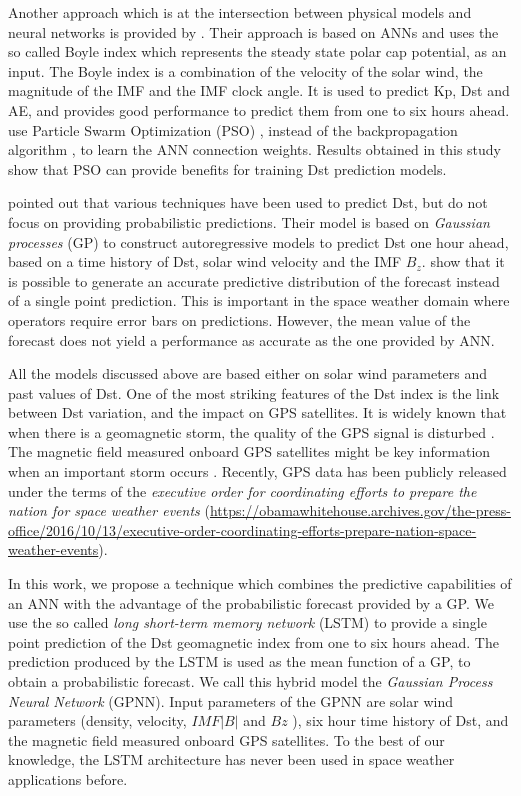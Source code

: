 Another approach which is at the intersection between physical models and neural networks is provided by 
\citet{Bala2012}. Their approach is based on ANNs and uses the so called Boyle index which represents 
the steady state polar cap potential, as an input. The Boyle index is a combination of the velocity of 
the solar wind, the magnitude of the IMF and the IMF clock angle. It is used to predict Kp, Dst and AE, 
and provides good performance to predict them from one to six hours ahead. \citet{Lazzus} use 
Particle Swarm Optimization (PSO) \citep{eberhart1995new}, instead of the backpropagation algorithm 
\citep{rummelhart1986parallel}, to learn the ANN connection weights. Results obtained in this study show 
that PSO can provide benefits for training Dst prediction models.

\citet{ChandorkarDst} pointed out that various techniques have been used to predict Dst, but do not 
focus on providing probabilistic predictions. Their model is based on \emph{Gaussian processes} (GP) to construct 
autoregressive models to predict Dst one hour ahead, based on a time history of Dst, solar wind velocity and 
the IMF $B_z$. \citet{ChandorkarDst} show that it is possible to generate an accurate predictive distribution 
of the forecast instead of a single point prediction. This is important in the space weather domain where 
operators require error bars on predictions. However, the mean value of the forecast does not yield a 
performance as accurate as the one provided by ANN. 

All the models discussed above are based either on solar wind parameters and past values of Dst. One of the most 
striking features of the Dst index is the link between Dst variation, and the impact on GPS satellites. 
It is widely known that when there is a geomagnetic storm, the quality of the GPS signal is disturbed 
\citep{astafyeva2014geomagnetic}. The magnetic field measured onboard GPS satellites might be key information 
when an important storm occurs \citep{morley2017energetic}. Recently, GPS data has been publicly released under 
the terms of the \emph{executive order for coordinating efforts to prepare the nation for space weather events} 
(\url{https://obamawhitehouse.archives.gov/the-press-office/2016/10/13/executive-order-coordinating-efforts-prepare-nation-space-weather-events}). 

In this work, we propose a technique which combines the predictive capabilities of an ANN with the advantage of the 
probabilistic forecast provided by a GP. We use the so called \emph{long short-term memory network} (LSTM) 
\citep{hochreiter1997long} to provide a single point prediction of the Dst geomagnetic index from one to six 
hours ahead. The prediction produced by the LSTM is used as the mean function of a GP, to obtain a 
probabilistic forecast. We call this hybrid model the \emph{Gaussian Process Neural Network} (GPNN). 
Input parameters of the GPNN are solar wind parameters (density, velocity,  
\( IMF  \vert B \vert  \)  and \(  Bz \) ), six hour time history of Dst, and the magnetic field 
measured onboard GPS satellites. To the best of our knowledge, the LSTM architecture has never 
been used in space weather applications before.

